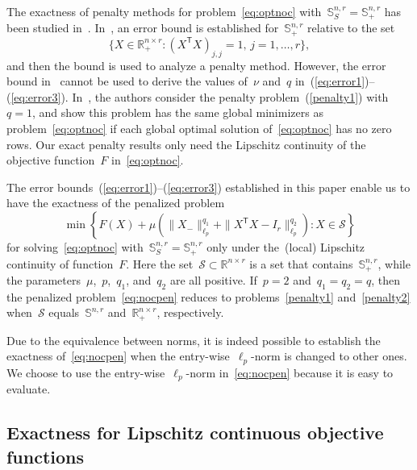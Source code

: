 \documentclass[11pt,a4paper]{article}  %
\theoremstyle{definition}
\newcommand{\RR}{\mathbb{R}}
\newcommand{\sset}{\mathcal{S}}
\newcommand{\penpar}{\mu}
\newcommand{\col}{r}
\newcommand{\stf}[1]{\mathbb{S}^{#1}}
\newcommand{\trs}{{\scriptstyle{\mathsf{T}}}}
\newcommand{\signmat}{S}
\begin{document}
The exactness of penalty methods for problem~\eqref{eq:optnoc}
with~$\stf{n,\col}_{\signmat} = \stf{n,\col}_+$ has been studied
in~\cite{Jiang_Meng_Wen_Chen_2023,Qian_Pan_Xiao_2023}.
In~\cite{Jiang_Meng_Wen_Chen_2023}, an error bound is established for~$\stf{n,\col}_+$ relative to the set
\[
\{X\in \RR^{n\times \col}_+ \mathrel{:} (X^\trs X)_{j,j}=1,\, j = 1, \dots, \col\},
\]
and then the bound is used to analyze a penalty method.
However, the
error bound in~\cite{Jiang_Meng_Wen_Chen_2023} cannot be used to  derive the values of~$\nu$ and~$q$
in~(\ref{eq:error1})--(\ref{eq:error3}).
In~\cite{Qian_Pan_Xiao_2023}, the authors consider
the penalty problem~(\ref{penalty1}) with~$q=1$, and show
this problem has the same global minimizers as problem~\eqref{eq:optnoc}
if each global optimal solution of~\eqref{eq:optnoc}  has no zero rows.  Our exact penalty results
only need the Lipschitz continuity of the objective function~$F$ in~\eqref{eq:optnoc}.



The error bounds~\mbox{(\ref{eq:error1})--(\ref{eq:error3})} established in this paper
enable us to have the exactness of the penalized problem
\begin{equation}
    \label{eq:nocpen}
    \min \left\{ F(X) + \penpar\left(\|X_{-}\|_{\ell_{p}}^{q_1} + \|X^\trs X - I_\col\|_{\ell_{p}}^{q_2} \right) \mathrel{:} X \in \sset\right\}
\end{equation}
for solving~\eqref{eq:optnoc}
with~$\stf{n,\col}_{\signmat} = \stf{n,\col}_+$
only under the~(local) Lipschitz continuity of function~$F$.
Here the set~$\sset \subset \RR^{n\times \col}$ is a set that contains~$\stf{n,\col}_+$,
while the parameters~$\penpar$,~$p$,~$q_1$, and~$q_2$ are all positive.
If~$p = 2$ and~$q_1 = q_2 = q$, then the penalized problem~\eqref{eq:nocpen} reduces to
problems~\eqref{penalty1} and~\eqref{penalty2}
when~$\sset$ equals~$\stf{n,\col}$ and~$\RR^{n\times \col}_+$, respectively.

Due to the equivalence between norms, it is indeed possible to establish the exactness
of~\eqref{eq:nocpen} when the entry-wise~$\ell_p$-norm is changed to other ones.
We choose to use the entry-wise~$\ell_p$-norm in~\eqref{eq:nocpen} because it is easy to evaluate.


\subsection{Exactness for Lipschitz continuous objective functions}\label{ssec:exactposorth}
\end{document}
